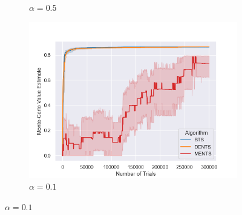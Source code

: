 \begin{figure}
\begin{subfigure}[b]{0.32\textwidth}
                    \caption{$\alpha=0.5$}
                \end{subfigure}
                \begin{subfigure}[b]{0.32\textwidth}
                    \centering
                    \includegraphics[width=\textwidth]{figures/temp/fl_sens/055_fl8_0_1_01.png}
                    \caption{$\alpha=0.1$}
                \end{subfigure}
                

\end{figure}
